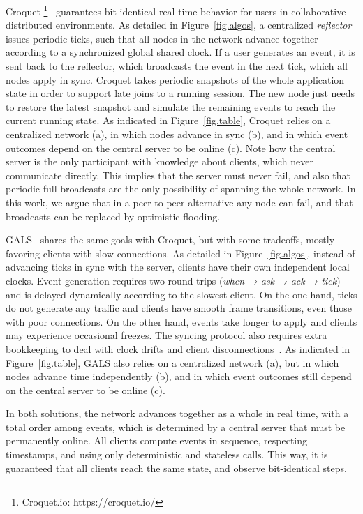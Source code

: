 \documentclass[fleqn,10pt]{SelfArx}
\begin{document}
Croquet%
\footnote{Croquet.io: https://croquet.io/}~\cite{croquet} guarantees
bit-identical real-time behavior for users in collaborative distributed
environments.
%
As detailed in Figure~\ref{fig.algos}, a centralized \emph{reflector} issues
periodic ticks, such that all nodes in the network advance together according
to a synchronized global shared clock.
If a user generates an event, it is sent back to the reflector, which
broadcasts the event in the next tick, which all nodes apply in sync.
%
Croquet takes periodic snapshots of the whole application state in order to
support late joins to a running session.
The new node just needs to restore the latest snapshot and simulate the
remaining events to reach the current running state.
%
As indicated in Figure~\ref{fig.table}, Croquet relies on a centralized
network (a), in which nodes advance in sync (b), and in which event outcomes
depend on the central server to be online (c).
%
Note how the central server is the only participant with knowledge about
clients, which never communicate directly.
This implies that the server must never fail, and also that periodic full
broadcasts are the only possibility of spanning the whole network.
In this work, we argue that in a peer-to-peer alternative any node can fail,
and that broadcasts can be replaced by optimistic flooding.

GALS~\cite{gals} shares the same goals with Croquet, but with some tradeoffs,
mostly favoring clients with slow connections.
As detailed in Figure~\ref{fig.algos}, instead of advancing ticks in sync with
the server, clients have their own independent local clocks.
Event generation requires two round trips (\emph{when → ask → ack → tick}) and is
delayed dynamically according to the slowest client.
%
On the one hand, ticks do not generate any traffic and clients have smooth
frame transitions, even those with poor connections.
On the other hand, events take longer to apply and clients may experience
occasional freezes.
The syncing protocol also requires extra bookkeeping to deal with clock drifts
and client disconnections~\cite{gals}.
%
As indicated in Figure~\ref{fig.table}, GALS also relies on a centralized
network (a), but in which nodes advance time independently (b), and in which
event outcomes still depend on the central server to be online (c).

In both solutions, the network advances together as a whole in real time, with
a total order among events, which is determined by a central server that must
be permanently online.
All clients compute events in sequence, respecting timestamps, and using only
deterministic and stateless calls.
This way, it is guaranteed that all clients reach the same state, and
observe bit-identical steps.
\end{document}

